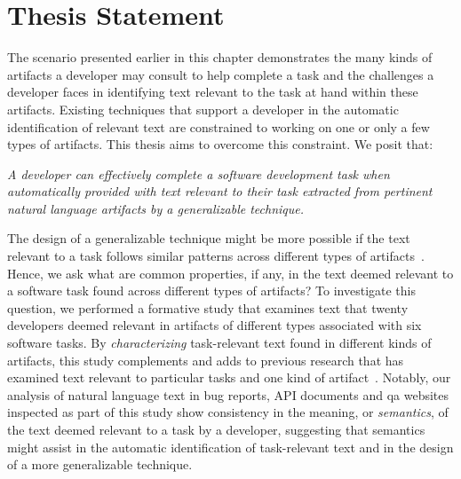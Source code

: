 

\section{Thesis Statement}
\label{cp1:thesis}





The scenario presented earlier in this chapter demonstrates
the
 many kinds of 
artifacts a developer may consult to help complete
 a task and the challenges a developer faces in identifying text relevant to the task at hand  within these 
artifacts.
Existing techniques that support a developer
in the automatic identification of relevant
text are constrained to working on one or only a 
few types of artifacts. This thesis aims to
overcome this constraint. We posit that:

\bigskip
\begin{bluequote}
    \textit{A developer can effectively complete a software development task when automatically provided with text relevant to their task extracted from pertinent natural language artifacts
    by a generalizable technique.}
\end{bluequote}
\medskip



The design of a generalizable technique might be
more possible if the text relevant to
a task follows similar patterns
 across different types of artifacts~\cite{Kintsch1978a}.
Hence, we ask what are common properties, if any, in the text deemed relevant 
to a software task  found across different types of artifacts?
To investigate this question, we performed a formative study that 
examines  text that twenty developers deemed relevant in artifacts 
of different types associated with six software tasks.
By \textit{characterizing} task-relevant text found in different kinds of artifacts,
this study complements and adds to previous research that has
examined text relevant to particular tasks and one kind of artifact~\cite{Ko2006, Rastkar2010, Chaparro2017, Robillard2015}.
Notably, our analysis of natural language text  in bug
reports, API documents and \acf{qa} websites 
inspected as part of this study 
 show consistency in the meaning, or \textit{semantics}, of the
 text deemed relevant to a task by a developer, suggesting that 
semantics might assist in the automatic identification of
task-relevant text and in the design of a more generalizable technique.




